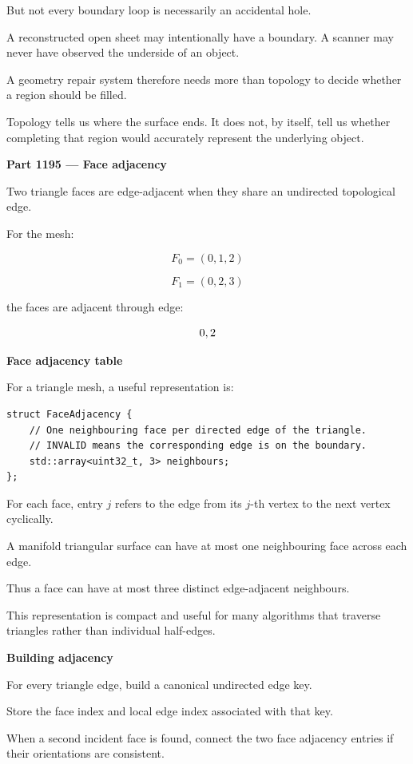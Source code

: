 But not every boundary loop is necessarily an accidental hole.

A reconstructed open sheet may intentionally have a boundary. A scanner may never have observed the underside of an object.

A geometry repair system therefore needs more than topology to decide whether a region should be filled.

Topology tells us where the surface ends. It does not, by itself, tell us whether completing that region would accurately represent the underlying object.

\textbf{Part 1195 --- Face adjacency}

Two triangle faces are edge-adjacent when they share an undirected topological edge.

For the mesh:

\[
F_0=(0,1,2)
\]

\[
F_1=(0,2,3)
\]

the faces are adjacent through edge:

\[
\\{0,2\\}
\]

\textbf{Face adjacency table}

For a triangle mesh, a useful representation is:

\begin{verbatim}
struct FaceAdjacency {
    // One neighbouring face per directed edge of the triangle.
    // INVALID means the corresponding edge is on the boundary.
    std::array<uint32_t, 3> neighbours;
};
\end{verbatim}

For each face, entry \(j\) refers to the edge from its \(j\)-th vertex to the next vertex cyclically.

A manifold triangular surface can have at most one neighbouring face across each edge.

Thus a face can have at most three distinct edge-adjacent neighbours.

This representation is compact and useful for many algorithms that traverse triangles rather than individual half-edges.

\textbf{Building adjacency}

For every triangle edge, build a canonical undirected edge key.

Store the face index and local edge index associated with that key.

When a second incident face is found, connect the two face adjacency entries if their orientations are consistent.

